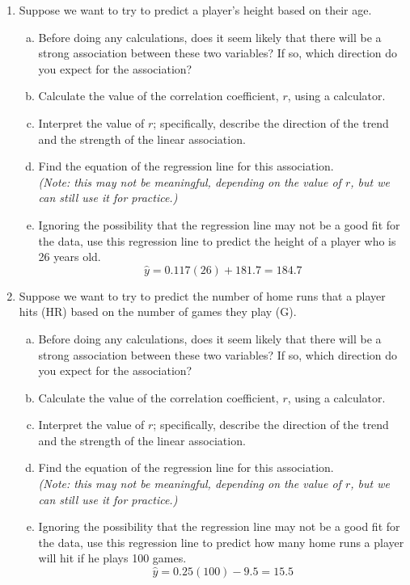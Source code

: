 \begin{enumerate}
\item Suppose we want to try to predict a player's height based on their age.
\begin{enumerate}[(a)]
\item Before doing any calculations, does it seem likely that there will be a strong association between these two variables?  If so, which direction do you expect for the association? 
\item Calculate the value of the correlation coefficient, $r$, using a calculator. 
\item Interpret the value of $r$; specifically, describe the direction of the trend and the strength of the linear association. 
\item Find the equation of the regression line for this association.\\
\emph{(Note: this may not be meaningful, depending on the value of $r$, but we can still use it for practice.)} 
\item Ignoring the possibility that the regression line may not be a good fit for the data, use this regression line to predict the height of a player who is 26 years old. \answersub{184.7 cm}
\[\hat{y} = 0.117(26) + 181.7 = 184.7\]
\end{enumerate}

\item Suppose we want to try to predict the number of home runs that a player hits (HR) based on the number of games they play (G).
\begin{enumerate}[(a)]
\item Before doing any calculations, does it seem likely that there will be a strong association between these two variables?  If so, which direction do you expect for the association? 
\item Calculate the value of the correlation coefficient, $r$, using a calculator. 
\item Interpret the value of $r$; specifically, describe the direction of the trend and the strength of the linear association. 
\item Find the equation of the regression line for this association.\\
\emph{(Note: this may not be meaningful, depending on the value of $r$, but we can still use it for practice.)} 
\item Ignoring the possibility that the regression line may not be a good fit for the data, use this regression line to predict how many home runs a player will hit if he plays 100 games. 
\[\hat{y} = 0.25(100) - 9.5 = 15.5\]
\end{enumerate}
\pagebreak


\end{enumerate}
